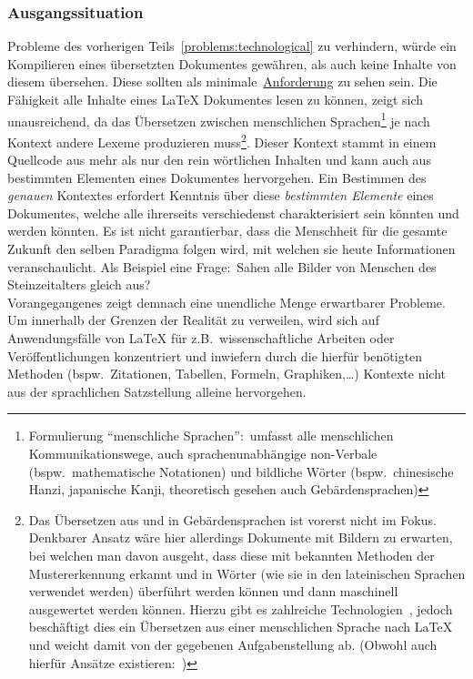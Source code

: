 \subsubsection{Ausgangssituation}
Probleme des vorherigen Teils~\ref{problems:technological} zu verhindern, würde ein Kompilieren eines übersetzten Dokumentes gewähren, als auch keine Inhalte von diesem übersehen. Diese sollten als minimale~\hyperref[technologies:demands]{Anforderung} zu sehen sein. Die Fähigkeit alle Inhalte eines \LaTeX{} Dokumentes lesen zu können, zeigt sich unausreichend, da das Übersetzen zwischen menschlichen Sprachen\footnote{Formulierung \enquote{menschliche Sprachen}:\ umfasst alle menschlichen Kommunikationswege, auch sprachenunabhängige non-Verbale (bspw.\ mathematische Notationen) und bildliche Wörter (bspw.\ chinesische Hanzi, japanische Kanji, theoretisch gesehen auch Gebärdensprachen)} je nach Kontext andere Lexeme produzieren muss\footnote{Das Übersetzen aus und in Gebärdensprachen ist vorerst nicht im Fokus. Denkbarer Ansatz wäre hier allerdings Dokumente mit Bildern zu erwarten, bei welchen man davon ausgeht, dass diese mit bekannten Methoden der Mustererkennung erkannt und in Wörter (wie sie in den lateinischen Sprachen verwendet werden) überführt werden können und dann maschinell ausgewertet werden können. Hierzu gibt es zahlreiche Technologien~\citep{expertSystemsWithApplications:rastgooRazie2021:signLanguageRecognitionADeepSurvey}, jedoch beschäftigt dies ein Übersetzen aus einer menschlichen Sprache nach \LaTeX{} und weicht damit von der gegebenen Aufgabenstellung ab. (Obwohl auch hierfür Ansätze existieren:~\cite{cornellComputerScienceComputerVisionPatternRecognition:korzhDmitrii2025:speechToLaTeXnewModelsAndDatasetsForConvertingSpokenEquationsAndSentences})}.
Dieser Kontext stammt in einem Quellcode aus mehr als nur den rein wörtlichen Inhalten und kann auch aus bestimmten Elementen eines Dokumentes hervorgehen. 
Ein Bestimmen des \textit{genauen} Kontextes erfordert Kenntnis über diese \textit{bestimmten Elemente} eines Dokumentes, welche alle ihrerseits verschiedenst charakterisiert sein könnten und werden könnten. Es ist nicht garantierbar, dass die Menschheit für die gesamte Zukunft den selben Paradigma folgen wird, mit welchen sie heute Informationen veranschaulicht. Als Beispiel eine Frage:\ Sahen alle Bilder von Menschen des Steinzeitalters gleich aus?\\

Vorangegangenes zeigt demnach eine unendliche Menge erwartbarer Probleme. Um innerhalb der Grenzen der Realität zu verweilen, wird sich auf Anwendungsfälle von \LaTeX{} für z.B.\ wissenschaftliche Arbeiten oder Veröffentlichungen konzentriert und inwiefern durch die hierfür benötigten Methoden (bspw.\ Zitationen, Tabellen, Formeln, Graphiken,\ldots)%
Kontexte nicht aus der sprachlichen Satzstellung alleine hervorgehen.%

